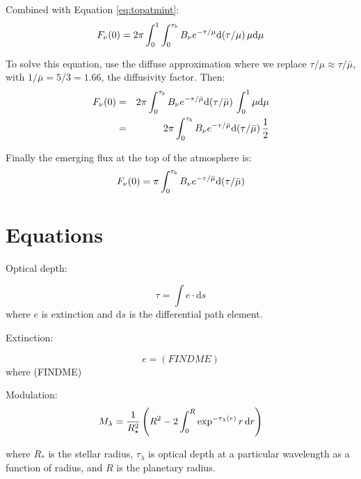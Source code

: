 \documentclass[letterpaper,12pt]{article}
\begin{document}
Combined with Equation \ref{eq:topatmint}:
\begin{equation}
F\sb{\nu}(0) = 2\pi \int\sb{0}\sp{1} \int\sb{0}\sp{\tau\sb{b}} B\sb{\nu}e\sp{-\tau/\mu}\der(\tau/\mu)\, \mu\der\mu
\end{equation}

To solve this equation, use the diffuse approximation where we
replace $\tau/\mu \approx \tau/\bar{\mu}$, with $1/\bar{\mu} = 5/3 =
1.66$, the diffusivity factor.  Then:
\begin{eqnarray}
F\sb{\nu}(0) & = & 2\pi \int\sb{0}\sp{\tau\sb{b}} B\sb{\nu}e\sp{-\tau/\bar{\mu}}\der(\tau/\bar{\mu})\, \int\sb{0}\sp{1}\mu\der\mu \\
             & = & 2\pi \int\sb{0}\sp{\tau\sb{b}} B\sb{\nu}e\sp{-\tau/\bar{\mu}}\der(\tau/\bar{\mu})\, \frac{1}{2}
\end{eqnarray}

Finally the emerging flux at the top of the atmosphere is:
\begin{equation}
F\sb{\nu}(0) = \pi \int\sb{0}\sp{\tau\sb{b}} B\sb{\nu}e\sp{-\tau/\bar{\mu}}\der(\tau/\bar{\mu})
\end{equation}

\section{Equations}
Optical depth:

\begin{equation}
\label{eqn:tau}
\tau = \int e \cdot \mathrm{d}s
\end{equation}
\noindent
where $e$ is extinction and d$s$ is the differential path element. \newline

\noindent
Extinction:

\begin{equation}
\label{eqn:ext}
e = (FINDME)
\end{equation}
\noindent
where (FINDME) \newline

\noindent
Modulation:
\begin{equation}
\label{eqn:mod}
M_{\lambda} = \frac{1}{R_\star^2}\left(R^2 - 2\int_{0}^{R} \exp^{-\tau_\lambda(r)} r\,{\rm d}r\right)
\end{equation}

\noindent
where $R_{*}$ is the stellar radius, $\tau_\lambda$ is optical depth at a particular wavelength as a function of radius, and $R$ is the planetary radius. \newline
\end{document}
